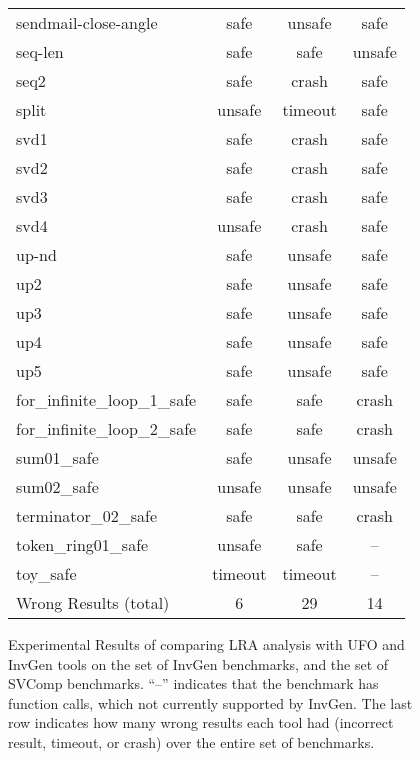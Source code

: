 \begin{figure}
\begin{tabular}{|l|c|c|c|}
 sendmail-close-angle     & safe    & unsafe  & safe                  \\
 seq-len                  & safe    & safe    & unsafe                \\
 seq2                     & safe    & crash   & safe                  \\
 split                    & unsafe  & timeout & safe                  \\
 svd1                     & safe    & crash   & safe                  \\
 svd2                     & safe    & crash   & safe                  \\
 svd3                     & safe    & crash   & safe                  \\
 svd4                     & unsafe  & crash   & safe                  \\
 up-nd                    & safe    & unsafe  & safe                  \\
 up2                      & safe    & unsafe  & safe                  \\
 up3                      & safe    & unsafe  & safe                  \\
 up4                      & safe    & unsafe  & safe                  \\
 up5                      & safe    & unsafe  & safe                  \\ \hline \hline

 for\_infinite\_loop\_1\_safe & safe    & safe    & crash                 \\
 for\_infinite\_loop\_2\_safe & safe    & safe    & crash                 \\
 sum01\_safe               & safe    & unsafe  & unsafe                \\
 sum02\_safe               & unsafe  & unsafe  & unsafe                \\
 terminator\_02\_safe       & safe    & safe    & crash                 \\
 token\_ring01\_safe        & unsafe  & safe    & --                    \\
 toy\_safe                 & timeout & timeout & --                    \\ \hline \hline 

 Wrong Results (total)     & 6       & 29      & 14                    \\ \hline

\end{tabular}
\caption{Experimental Results of comparing LRA analysis with UFO and InvGen tools on 
the set of InvGen benchmarks, and the set of SVComp benchmarks. ``--'' indicates that the
benchmark has function calls, which not currently supported by {\sc InvGen}. The last row indicates
how many wrong results each tool had (incorrect result, timeout, or crash) over the entire set of benchmarks. }
\end{figure}
